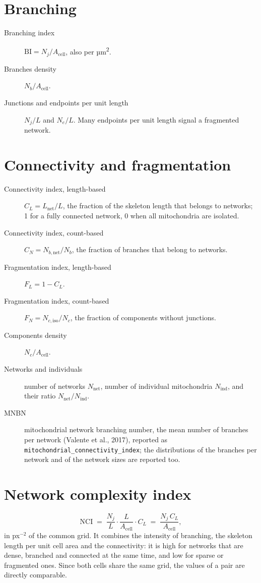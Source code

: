 \documentclass[fontsize=10.5pt,paper=a4,parskip=half,headings=normal,numbers=noenddot,
  open=any,captions=tableheading]{scrreprt}
\begin{document}
\section{Branching}
\begin{description}
\item[Branching index] $\mathrm{BI} = N_j/A_{\mathrm{cell}}$, also per µm\textsuperscript{2}.
\item[Branches density] $N_b/A_{\mathrm{cell}}$.
\item[Junctions and endpoints per unit length] $N_j/L$ and $N_e/L$. Many endpoints per unit length signal a fragmented network.
\end{description}

\section{Connectivity and fragmentation}
\begin{description}
\item[Connectivity index, length-based] $C_L = L_{\mathrm{net}}/L$, the fraction of the skeleton length that belongs to networks; 1 for a fully connected network, 0 when all mitochondria are isolated.
\item[Connectivity index, count-based] $C_N = N_{b,\mathrm{net}}/N_b$, the fraction of branches that belong to networks.
\item[Fragmentation index, length-based] $F_L = 1-C_L$.
\item[Fragmentation index, count-based] $F_N = N_{c,\mathrm{iso}}/N_c$, the fraction of components without junctions.
\item[Components density] $N_c/A_{\mathrm{cell}}$.
\item[Networks and individuals] number of networks $N_{\mathrm{net}}$, number of individual mitochondria $N_{\mathrm{ind}}$, and their ratio $N_{\mathrm{net}}/N_{\mathrm{ind}}$.
\item[MNBN] mitochondrial network branching number, the mean number of branches per network (Valente et al., 2017), reported as \texttt{mitochondrial\_connectivity\_index}; the distributions of the branches per network and of the network sizes are reported too.
\end{description}

\section{Network complexity index}
\begin{equation*}
\mathrm{NCI} \;=\; \frac{N_j}{L}\cdot\frac{L}{A_{\mathrm{cell}}}\cdot C_L \;=\; \frac{N_j\,C_L}{A_{\mathrm{cell}}},
\end{equation*}
in px$^{-2}$ of the common grid. It combines the intensity of branching, the skeleton length per unit cell area and the connectivity: it is high for networks that are dense, branched and connected at the same time, and low for sparse or fragmented ones. Since both cells share the same grid, the values of a pair are directly comparable.
\end{document}
